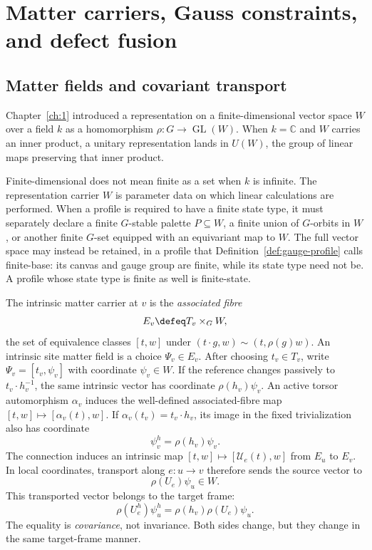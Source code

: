\section{Matter carriers, Gauss constraints, and defect fusion}
\label{sec:matter-textbook}

\subsection{Matter fields and covariant transport}

Chapter~\ref{ch:1} introduced a representation on a finite-dimensional vector space $W$
over a field $k$ as a homomorphism
$\rho:G\to\operatorname{GL}(W)$.  When $k=\mathbb C$ and $W$ carries an inner
product, a unitary representation lands in $U(W)$, the group of linear maps
preserving that inner product.

Finite-dimensional does not mean finite as a set when $k$ is infinite.  The
representation carrier $W$ is parameter data on which linear calculations are
performed.  When a profile is required to have a finite state type, it must
separately declare a finite $G$-stable palette $P\subseteq W$, a finite union
of $G$-orbits in $W$, or another finite $G$-set equipped with an equivariant
map to $W$.  The full vector space may instead be retained, in a profile
that Definition~\ref{def:gauge-profile} calls finite-base: its canvas and
gauge group are finite, while its state type need not be.  A profile whose
state type is finite as well is finite-state.

The intrinsic matter carrier at $v$ is the \emph{associated fibre}
\[
 E_v\defeq T_v\times_G W,
\]
the set of equivalence classes $[t,w]$ under
$(t\cdot g,w)\sim(t,\rho(g)w)$.  An intrinsic site matter field is a choice
$\Psi_v\in E_v$.  After choosing $t_v\in T_v$, write
$\Psi_v=[t_v,\psi_v]$ with coordinate $\psi_v\in W$.  If the reference changes
passively to $t_v\cdot h_v^{-1}$, the same intrinsic vector has coordinate
$\rho(h_v)\psi_v$.  An active torsor automorphism $\alpha_v$ induces the
well-defined associated-fibre map
$[t,w]\mapsto[\alpha_v(t),w]$.  If
$\alpha_v(t_v)=t_v\cdot h_v$, its image in the fixed trivialization also has
coordinate
\begin{equation}
\psi_v^h=\rho(h_v)\psi_v.
 \label{eq:matter-gauge-action}
\end{equation}
The connection induces an intrinsic map
$[t,w]\mapsto[\mathcal U_e(t),w]$ from $E_u$ to $E_v$.  In local coordinates,
transport along $e:u\to v$ therefore sends the source vector to
\[
 \rho(U_e)\psi_u\in W.
\]
This transported vector belongs to the target frame:
\begin{equation}
\rho(U_e^h)\psi_u^h
 =\rho(h_v)\rho(U_e)\psi_u.
 \label{eq:matter-covariance}
\end{equation}
The equality is \emph{covariance}, not invariance.  Both sides change, but
they change in the same target-frame manner.

